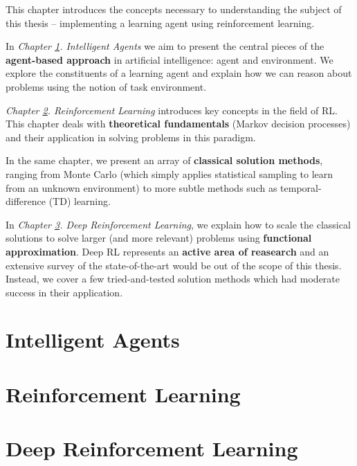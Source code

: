 This chapter introduces the concepts necessary to understanding the subject of this thesis -- implementing a learning agent using reinforcement learning.

In \emph{Chapter \ref{agents-intro}. Intelligent Agents} we aim to present the central pieces of the \textbf{agent-based approach} in artificial intelligence: agent and environment.
We explore the constituents of a learning agent and explain how we can reason about problems using the notion of task environment.

\emph{Chapter \ref{reinforcement-learning}. Reinforcement Learning} introduces key concepts in the field of RL. This chapter deals with \textbf{theoretical fundamentals} (Markov decision processes) and their application in solving problems in this paradigm.

In the same chapter, we present an array of \textbf{classical solution methods}, ranging from Monte Carlo (which simply applies statistical sampling to learn from an unknown environment) to more subtle methods such as temporal-difference (TD) learning.

In \emph{Chapter \ref{deep-rl}. Deep Reinforcement Learning}, we explain how to scale the classical solutions to solve larger (and more relevant) problems using \textbf{functional approximation}.
Deep RL represents an \textbf{active area of reasearch} and an extensive survey of the state-of-the-art would be out of the scope of this thesis.
Instead, we cover a few tried-and-tested solution methods which had moderate success in their application.

\clearpage

\section{Intelligent Agents} \label{agents-intro}


\section{Reinforcement Learning} \label{reinforcement-learning}


\section{Deep Reinforcement Learning} \label{deep-rl}
